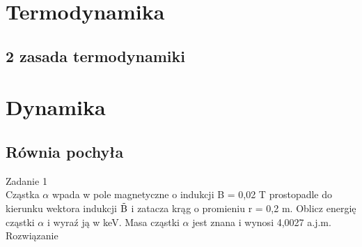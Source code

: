 \documentclass{article}
\begin{document}
\section{Termodynamika}
\subsection{2 zasada termodynamiki}
\section{Dynamika}
\subsection{Równia pochyła}
Zadanie 1 \\
Cząstka $\alpha$ wpada w pole magnetyczne o indukcji B = 0,02 T prostopadle do kierunku wektora indukcji $\rm \vec{B}$
i zatacza krąg o promieniu r = 0,2 m. Oblicz energię cząstki $\alpha$ i wyraź ją w keV. 
Masa cząstki $\alpha$ jest znana i wynosi 4,0027 a.j.m.
Rozwiązanie \\
\end{document}
